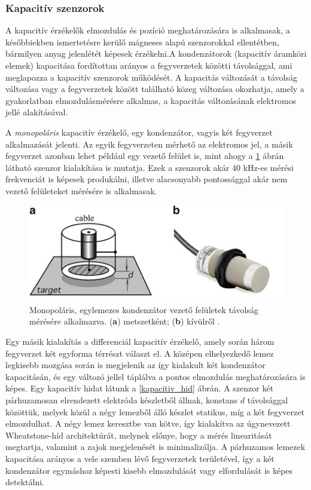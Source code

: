 \subsubsection{Kapacitív szenzorok}

A kapacitív érzékelők elmozdulás és pozíció meghatározására is alkalmasak, a későbbiekben ismertetésre kerülő mágneses alapú szenzorokkal ellentétben, bármilyen anyag jelenlétét képesek érzékelni.A kondenzátorok (kapacitív áramköri elemek) kapacitása fordítottan arányos a fegyverzetek közötti távolsággal, ami meglapozza a kapacitív szenzorok működését. A kapacitás változását a távolság változása vagy a fegyverzetek között található közeg változása okozhatja, amely a gyakorlatban elmozdulásmérésre alkalmas, a kapacitás változásának elektromos jellé alakításával.

 A \textit{monopoláris} kapacitív érzékelő, egy kondenzátor, vagyis két fegyverzet alkalmazását jelenti. Az egyik fegyverzeten mérhető az elektromos jel, a másik fegyverzet azonban lehet például egy vezető felület is, mint ahogy a \ref{kapacitiv_kabel} ábrán látható szenzor kialakítása is mutatja. Ezek a szenzorok akár 40 kHz-es mérési frekvenciát is képesek produkálni, illetve alacsonyabb pontossággal akár nem vezető felületeket mérésére is alkalmasak.
\begin{figure}
	\centering
	\includegraphics[width=.7\columnwidth]{figures/kapacitiv_szenzor_kabeles.png}
	\caption{Monopoláris, egylemezes kondenzátor vezető felületek távolság mérésére alkalmazva. (\textbf{a}) metszetként; (\textbf{b}) kívülről \cite{Fraden2016a}.}
	\label{kapacitiv_kabel}
\end{figure}
Egy másik kialakítás a differenciál kapacitív érzékelő, amely során három fegyverzet két egyforma térrészt választ el. A középen elhelyezkedő lemez legkisebb mozgása során is megjelenik az így kialakult két kondenzátor kapacitásán, és egy változó jellel táplálva a pontos elmozdulás meghatározására is képes.
Egy kapacitív hidat látunk a \ref{kapacitiv_hid} ábrán. A szenzor két párhuzamosan elrendezett elektróda készletből állnak, konstans $d$ távolsággal közöttük, melyek közül a négy lemezből álló készlet statikus, míg a két fegyverzet elmozdulhat. A négy lemez keresztbe van kötve, így kialakítva az úgynevezett Wheatstone-híd architektúrát, melynek előnye, hogy a mérés linearitását megtartja, valamint a zajok megjelenését is minimalizálja. A párhuzamos lemezek kapacitása arányos a vele szemben lévő fegyverzetek területével, így a két kondenzátor egymáshoz képesti kisebb elmozdulását vagy elfordulását is képes detektálni. 
